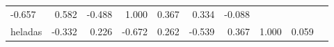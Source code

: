\documentclass[]{article}
\begin{document}
\begin{longtable}[]{@{}lrrrrrrrrr@{}}
\begin{minipage}[t]{0.10\columnwidth}
-0.657\strut
\end{minipage} & \begin{minipage}[t]{0.07\columnwidth}\raggedleft\strut
0.582\strut
\end{minipage} & \begin{minipage}[t]{0.05\columnwidth}\raggedleft\strut
-0.488\strut
\end{minipage} & \begin{minipage}[t]{0.07\columnwidth}\raggedleft\strut
1.000\strut
\end{minipage} & \begin{minipage}[t]{0.06\columnwidth}\raggedleft\strut
0.367\strut
\end{minipage} & \begin{minipage}[t]{0.05\columnwidth}\raggedleft\strut
0.334\strut
\end{minipage} & \begin{minipage}[t]{0.10\columnwidth}\raggedleft\strut
-0.088\strut
\end{minipage}\tabularnewline
\begin{minipage}[t]{0.10\columnwidth}\raggedright\strut
heladas\strut
\end{minipage} & \begin{minipage}[t]{0.08\columnwidth}\raggedleft\strut
-0.332\strut
\end{minipage} & \begin{minipage}[t]{0.07\columnwidth}\raggedleft\strut
0.226\strut
\end{minipage} & \begin{minipage}[t]{0.10\columnwidth}\raggedleft\strut
-0.672\strut
\end{minipage} & \begin{minipage}[t]{0.07\columnwidth}\raggedleft\strut
0.262\strut
\end{minipage} & \begin{minipage}[t]{0.05\columnwidth}\raggedleft\strut
-0.539\strut
\end{minipage} & \begin{minipage}[t]{0.07\columnwidth}\raggedleft\strut
0.367\strut
\end{minipage} & \begin{minipage}[t]{0.06\columnwidth}\raggedleft\strut
1.000\strut
\end{minipage} & \begin{minipage}[t]{0.05\columnwidth}\raggedleft\strut
0.059\strut
\end{minipage} & \begin{minipage}[t]{0.10\columnwidth}\raggedleft\strut

\end{minipage}
\end{longtable}
\end{document}
